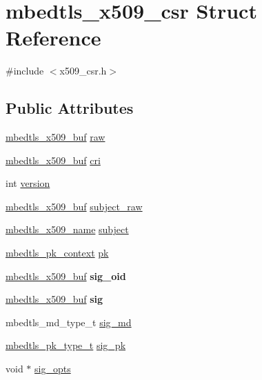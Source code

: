 \hypertarget{structmbedtls__x509__csr}{\section{mbedtls\-\_\-x509\-\_\-csr Struct Reference}
\label{structmbedtls__x509__csr}
}


{\ttfamily \#include $<$x509\-\_\-csr.\-h$>$}

\subsection*{Public Attributes}
\begin{DoxyCompactItemize}
\item 
\hyperlink{group__x509__module_ga4d02c9e8e4e2934555e0d132cd2976dc}{mbedtls\-\_\-x509\-\_\-buf} \hyperlink{structmbedtls__x509__csr_ad3c60458143eb1ddedfa573466931a70}{raw}
\item 
\hyperlink{group__x509__module_ga4d02c9e8e4e2934555e0d132cd2976dc}{mbedtls\-\_\-x509\-\_\-buf} \hyperlink{structmbedtls__x509__csr_a6adcb10c37a6bc946310d54567468f8a}{cri}
\item 
int \hyperlink{structmbedtls__x509__csr_a455e44fb96cdcd346788e0a41d7ab2b5}{version}
\item 
\hyperlink{group__x509__module_ga4d02c9e8e4e2934555e0d132cd2976dc}{mbedtls\-\_\-x509\-\_\-buf} \hyperlink{structmbedtls__x509__csr_ad85a7b3987a80254911b8d48a1beb78f}{subject\-\_\-raw}
\item 
\hyperlink{group__x509__module_ga2272228c7776102328df31623af3168c}{mbedtls\-\_\-x509\-\_\-name} \hyperlink{structmbedtls__x509__csr_a0c403df635495f8cba9b3e1001fc4491}{subject}
\item 
\hyperlink{structmbedtls__pk__context}{mbedtls\-\_\-pk\-\_\-context} \hyperlink{structmbedtls__x509__csr_abacfec387e945f59a35a106eebba0a1c}{pk}
\item 
\hypertarget{structmbedtls__x509__csr_a2d9ee56aee03832cb531eb78a53224f4}{\hyperlink{group__x509__module_ga4d02c9e8e4e2934555e0d132cd2976dc}{mbedtls\-\_\-x509\-\_\-buf} {\bfseries sig\-\_\-oid}}\label{structmbedtls__x509__csr_a2d9ee56aee03832cb531eb78a53224f4}

\item 
\hypertarget{structmbedtls__x509__csr_a2ba91f0de1e1002cb569db90781f954c}{\hyperlink{group__x509__module_ga4d02c9e8e4e2934555e0d132cd2976dc}{mbedtls\-\_\-x509\-\_\-buf} {\bfseries sig}}\label{structmbedtls__x509__csr_a2ba91f0de1e1002cb569db90781f954c}

\item 
mbedtls\-\_\-md\-\_\-type\-\_\-t \hyperlink{structmbedtls__x509__csr_afaf345aa794cfd4b5056ce49a67bb611}{sig\-\_\-md}
\item 
\hyperlink{pk_8h_a3fe41eff5605ae727eb9d28dad297020}{mbedtls\-\_\-pk\-\_\-type\-\_\-t} \hyperlink{structmbedtls__x509__csr_a670fac5f5b5cd7398e1b241dc257bc97}{sig\-\_\-pk}
\item 
void $\ast$ \hyperlink{structmbedtls__x509__csr_ac1152e686c27158c211b2c3fdfaefdb7}{sig\-\_\-opts}
\end{DoxyCompactItemize}


